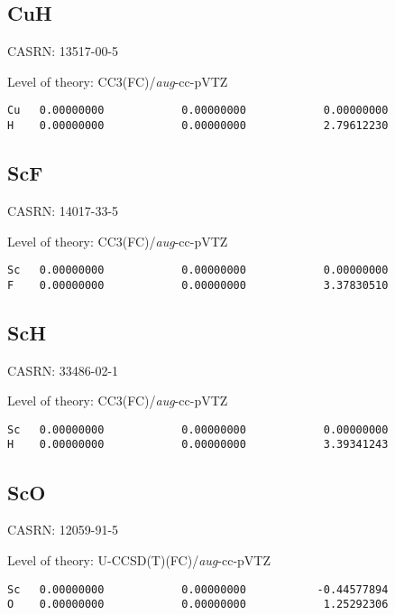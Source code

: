 \documentclass[journal=jctcce,manuscript=article,layout=traditional]{achemso}
\newcommand{\AVTZ}{\emph{aug}-cc-pVTZ}
\begin{document}
\subsection{CuH}

CASRN: 13517-00-5

\begin{singlespace}
\noindent Level of theory: CC3(FC)/{\AVTZ}
\begin{verbatim}
Cu   0.00000000            0.00000000            0.00000000
H    0.00000000            0.00000000            2.79612230
\end{verbatim}
\end{singlespace}


\subsection{ScF}

CASRN: 14017-33-5

\begin{singlespace}
\noindent Level of theory: CC3(FC)/{\AVTZ}
\begin{verbatim}
Sc   0.00000000            0.00000000            0.00000000
F    0.00000000            0.00000000            3.37830510
\end{verbatim}
\end{singlespace}

\subsection{ScH}

CASRN: 33486-02-1

\begin{singlespace}
\noindent Level of theory: CC3(FC)/{\AVTZ}
\begin{verbatim}
Sc   0.00000000            0.00000000            0.00000000
H    0.00000000            0.00000000            3.39341243
\end{verbatim}
\end{singlespace}

\subsection{ScO}

CASRN: 12059-91-5

\begin{singlespace}
\noindent Level of theory: U-CCSD(T)(FC)/{\AVTZ}
\begin{verbatim}
Sc   0.00000000            0.00000000           -0.44577894
O    0.00000000            0.00000000            1.25292306
\end{verbatim}
\end{singlespace}
\end{document}
